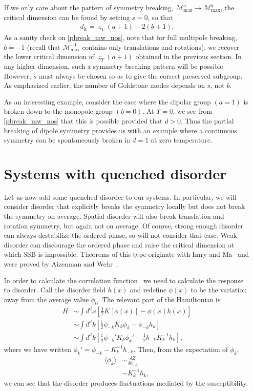 \documentclass[prb,aps,twocolumn, amsfonts,amsmath,amssymb,nofootinbib,superscriptaddress]{revtex4-2}
\newcommand{\nn}{\nonumber\\}
\renewcommand{\max}{\text{max}}
\newcommand{\half}{\frac{1}{2}}
\newcommand{\mmax}[1]{\mathcal{M}^{#1}_\max}
\begin{document}
If we only care about the pattern of symmetry breaking, $\mmax{a}\rightarrow \mmax{b}$, the critical dimension can be found by setting $s=0$, so that
\begin{align}
d_\text{lc} = \varsigma_T (a+1) -2 (b+1). \label{pbreak_mw_nos}
\end{align}
As a sanity check on \eqref{pbreak_mw_nos}, note that for full multipole breaking, $b=-1$ (recall that $\mmax{-1}$ contains only translations and rotations), we recover the lower critical dimension of $\varsigma_T(a+1)$ obtained in the previous section. 
In any higher dimension, such a symmetry breaking pattern will be possible. However, $s$ must always be chosen so as to give the correct preserved subgroup. As emphasized earlier, the number of Goldstone modes depends on $s$, not $b$.

As an interesting example, consider the case where the dipolar group $(a=1)$ is broken down to the monopole group $(b=0)$. At $T=0$, we see from \eqref{pbreak_mw_nos} that this is possible provided that $d>0$. Thus the partial breaking of dipole symmetry provides us with an example where a continuous symmetry can be spontaneously broken in $d=1$ at zero temperature. 

\section{Systems with quenched disorder} \label{sec:disord}

Let us now add some quenched disorder to our systems. In particular, we will consider disorder that explicitly breaks the symmetry locally but does not break the symmetry on average. Spatial disorder will also break translation and rotation symmetry, but again not on average. Of course, strong enough disorder can always destabilize the ordered phase, so will not consider that case. Weak disorder can discourage the ordered phase and raise the critical dimension at which SSB is impossible. Theorems of this type originate with Imry and Ma~\cite{ImryMa} and were proved by Aizenman and Wehr~\cite{Aizenman}.

In order to calculate the
correlation function~\cite{ImryMa} we need to calculate the response to disorder. Call the disorder field $h(x)$ and redefine $\phi(x)$ to be the variation away from the average value $\phi_0$. The relevant part of the Hamiltonian is 
\begin{align}
H &\sim \int d^dx \left[ \half K[ \phi(x)] - \phi(x) h(x) \right] \nn
&\sim \int d^dk \left[ \half \phi_{-k} K_k \phi_k - \phi_{-k} h_k \right] \nn
&\sim \int d^dk \left[ \half \phi_{-k}' K_k \phi_k' - \half h_{-k} K^{-1}_k h_k \right],
\end{align}
where we have written $\phi_k' = \phi_{-k} - K^{-1}_k h_{-k}$. Then, from the expectation of $\phi_k$,
\begin{align}
\langle \phi_k \rangle &\sim \frac{\delta Z}{\delta h_{-k} } \nn
&\sim K_k^{-1} h_{k},
\end{align}
we can see that the disorder produces fluctuations mediated by the susceptibility.
\end{document}
